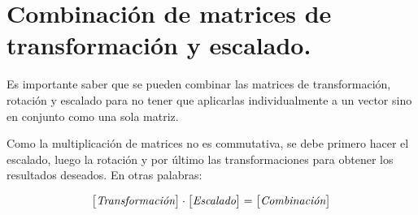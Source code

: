 \section{Combinación de matrices de transformación y escalado.}
    Es importante saber que se pueden combinar las matrices
de transformación, rotación y escalado para no tener que
aplicarlas individualmente a un vector sino en conjunto como
una sola matriz.\par
    Como la multiplicación de matrices no es commutativa,
se debe primero hacer el escalado, luego la rotación y por
último las transformaciones para obtener los resultados deseados. En otras palabras:\par
\begin{align*}
    \begin{bmatrix} \textit{Transformación} \end{bmatrix} \cdot
    \begin{bmatrix} \textit{Escalado} \end{bmatrix} =
    \begin{bmatrix} \textit{Combinación} \end{bmatrix}
\end{align*}
